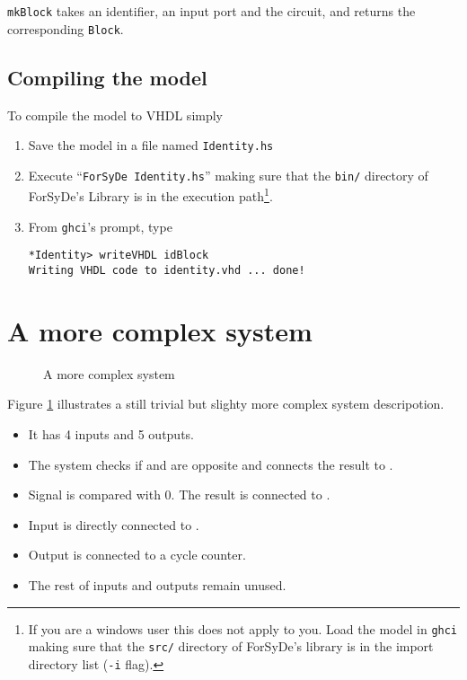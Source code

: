 \texttt{mkBlock} takes an identifier, an input port and the circuit, and
returns the corresponding \texttt{Block}.

\subsection{Compiling the model}

To compile the model to VHDL simply

\begin{enumerate}[1)]
\item Save the model in a file named \texttt{Identity.hs}
\item Execute ``\texttt{ForSyDe Identity.hs}'' making sure that the
  \texttt{bin/} directory of ForSyDe's Library is in the execution
  path\footnote{If you are a windows user this does not apply to you.
    Load the model in \texttt{ghci} making sure that the \texttt{src/}
    directory of ForSyDe's library is in the import directory list
    (\texttt{-i} flag).}.
\item From \texttt{ghci}'s prompt, type
\begin{verbatim}
*Identity> writeVHDL idBlock
Writing VHDL code to identity.vhd ... done!
\end{verbatim}
\end{enumerate}

\section{A more complex system}
\begin{figure}
\centering

  \caption{A more complex system}
  \label{fig:complex}
\end{figure}
Figure \ref{fig:complex} illustrates a still trivial but slighty
more complex system descripotion.

\begin{itemize}
\item  It has 4 inputs and 5 outputs. 
\item The system checks if  and  are opposite
  and connects the result to .
\item Signal  is compared with 0. The result is connected to
  .
\item Input  is directly connected to .
\item Output  is connected to a cycle counter.
\item The rest of inputs and outputs remain unused.
\end{itemize}


